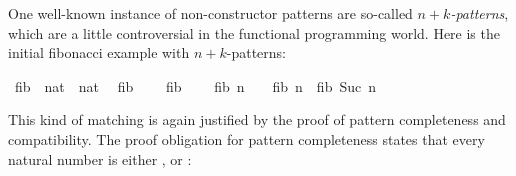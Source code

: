 \begin{isabellebody}
\begin{isamarkuptext}
  One well-known instance of non-constructor patterns are
  so-called \emph{$n+k$-patterns}, which are a little controversial in
  the functional programming world. Here is the initial fibonacci
  example with $n+k$-patterns:%
\end{isamarkuptext}%
\isamarkuptrue%
\isamarkupfalse%
\ fib{}\ {\isacharcolon}{\isacharcolon}\ {\isachardoublequoteopen}nat\ {\isasymRightarrow}\ nat{\isachardoublequoteclose}\isanewline
{}\isanewline
\ \ {\isachardoublequoteopen}fib{}\ {}\ {\isacharequal}\ {}{\isachardoublequoteclose}\isanewline
{\isacharbar}\ {\isachardoublequoteopen}fib{}\ {}\ {\isacharequal}\ {}{\isachardoublequoteclose}\isanewline
{\isacharbar}\ {\isachardoublequoteopen}fib{}\ {\isacharparenleft}n\ {\isacharplus}\ {}{\isacharparenright}\ {\isacharequal}\ fib{}\ n\ {\isacharplus}\ fib{}\ {\isacharparenleft}Suc\ n{\isacharparenright}{\isachardoublequoteclose}\isanewline
%
\isadelimML
%
\endisadelimML
%
\isatagML
%
\endisatagML
{\isafoldML}%
%
\isadelimML
%
\endisadelimML
%
\isadelimproof
%
\endisadelimproof
%
\isatagproof
%
\begin{isamarkuptxt}%
This kind of matching is again justified by the proof of pattern
  completeness and compatibility. 
  The proof obligation for pattern completeness states that every natural number is
  either ,  or :


\end{isamarkuptxt}
\end{isabellebody}
